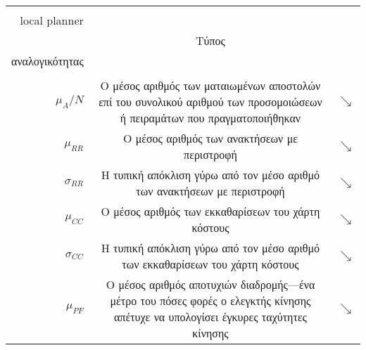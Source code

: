 \begin{table}\hspace{-2.5cm}
  \renewcommand{\arraystretch}{1.8}
  \begin{tabular}{rcc}
    \begin{minipage} [t]{0.25\columnwidth}Μετρική αξιολόγησης \\ local planner \\ \end{minipage} & Τύπος & \begin{minipage} [t]{0.2\columnwidth}Τύπος \\ αναλογικότητας \\ \end{minipage} \\ \toprule
    $\mu_{A} / N$ &
    \begin{minipage}[t]{0.7\columnwidth}%
      Ο μέσος αριθμός των ματαιωμένων αποστολών επί του συνολικού αριθμού των
      προσομοιώσεων ή πειραμάτων που πραγματοποιήθηκαν
    \end{minipage} & $\searrow$ \\
    $\mu_{RR}$ &
    \begin{minipage}[t]{0.7\columnwidth}%
      Ο μέσος αριθμός των ανακτήσεων με περιστροφή
    \end{minipage} & $\searrow$ \\
    $\sigma_{RR}$ &
    \begin{minipage}[t]{0.7\columnwidth}%
      Η τυπική απόκλιση γύρω από τον μέσο αριθμό των ανακτήσεων με περιστροφή
    \end{minipage} & $\searrow$ \\
    $\mu_{CC}$ &
    \begin{minipage}[t]{0.7\columnwidth}%
      Ο μέσος αριθμός των εκκαθαρίσεων του χάρτη κόστους
    \end{minipage} & $\searrow$ \\
    $\sigma_{CC}$ &
    \begin{minipage}[t]{0.7\columnwidth}%
      Η τυπική απόκλιση γύρω από τον μέσο αριθμό των εκκαθαρίσεων του χάρτη
      κόστους
    \end{minipage} & $\searrow$ \\
    $\mu_{PF}$ &
    \begin{minipage}[t]{0.7\columnwidth}%
      Ο μέσος αριθμός αποτυχιών διαδρομής---ένα μέτρο του πόσες φορές ο ελεγκτής
      κίνησης απέτυχε να υπολογίσει έγκυρες ταχύτητες κίνησης
    \end{minipage} & $\searrow$ \\

\end{tabular}
\end{table}
